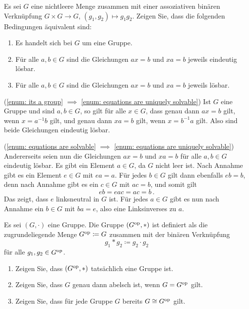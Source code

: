 \begin{question}[subtitle = Zur Definition von Gruppen]
  Es sei $G$ eine nichtleere Menge zusammen mit einer assoziativen binären Verknüpfung $G \times G \to G$, $(g_1, g_2) \mapsto g_1 g_2$.
  Zeigen Sie, dass die folgenden Bedingungen äquivalent sind:
  \begin{enumerate}[label=\roman*)]
    \item
      \label{enum: its a group}
      Es handelt sich bei $G$ um eine Gruppe.
    \item
      \label{enum: equations are uniquely solvable}
      Für alle $a, b \in G$ sind die Gleichungen $ax = b$ und $xa = b$ jeweils eindeutig lösbar.
    \item
      \label{enum: equations are solvable}
      Für alle $a, b \in G$ sind die Gleichungen $ax = b$ und $xa = b$ jeweils lösbar.
  \end{enumerate}
\end{question}


\begin{solution}
  (\ref{enum: its a group} $\implies$ \ref{enum: equations are uniquely solvable})
  Ist $G$ eine Gruppe und sind $a, b \in G$, so gilt für alle $x \in G$, dass genau dann $ax = b$ gilt, wenn $x = a^{-1} b$ gilt, und genau dann $xa = b$ gilt, wenn $x = b^{-1} a$ gilt.
  Also sind beide Gleichungen eindeutig lösbar.
  
  (\ref{enum: equations are solvable} $\implies$ \ref{enum: equations are uniquely solvable})
  Andererseits seien nun die Gleichungen $ax = b$ und $xa = b$ für alle $a, b \in G$ eindeutig lösbar.
  Es gibt ein Element $a \in G$, da $G$ nicht leer ist.
  Nach Annahme gibt es ein Element $e \in G$ mit $ea = a$.
  Für jedes $b \in G$ gilt dann ebenfalls $eb = b$, denn nach Annahme gibt es ein $c \in G$ mit $ac = b$, und somit gilt
  \[
      eb
    = eac
    = ac
    = b\,.
  \]
  Das zeigt, dass $e$ linksneutral in $G$ ist.
  Für jedes $a \in G$ gibt es nun nach Annahme ein $b \in G$ mit $ba = e$, also eine Linksinverses zu $a$.
\end{solution}


\begin{question}[subtitle={Die Gruppe $G^\op$}]
  Es sei $(G,\cdot)$ eine Gruppe.
  Die Gruppe $(G^{\operatorname{op}}, *)$ ist definiert als die zugrundeliegende Menge $G^{\operatorname{op}} \coloneqq G$ zusammen mit der binären Verknüpfung
  \[
              g_1 * g_2
    \coloneqq g_2 \cdot g_2
  \]
  für alle $g_1, g_2 \in G^{\operatorname{op}}$.
  \begin{enumerate}
    \item
      Zeigen Sie, dass $(G^{\operatorname{op}}, *)$ tatsächlich eine Gruppe ist.
    \item
      Zeigen Sie, dass $G$ genau dann abelsch ist, wenn $G = G^{\operatorname{op}}$ gilt.
    \item
      Zeigen Sie, dass für jede Gruppe $G$ bereits $G \cong G^{\operatorname{op}}$ gilt.
  \end{enumerate}
\end{question}


